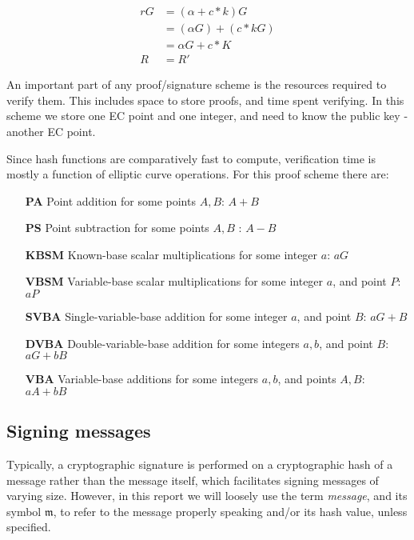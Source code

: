 \begin{align*}
r G &= (\alpha + c*k) G \\
	&= (\alpha G) + (c*k G) \\
	&= \alpha G + c*K \\
  R &= R'
\end{align*}

An important part of any proof/signature scheme is the resources required to verify them. This includes space to store proofs, and time spent verifying. In this scheme we store one EC point and one integer, and need to know the public key - another EC point.

Since hash functions are comparatively fast to compute, verification time is mostly a function of elliptic curve operations. For this proof scheme there are: 

\begin{itemize}
    \setlength\itemsep{\listspace}
    \item [\textbf{PA}] Point addition for some points $A, B$: $A + B$ \quad [1]
    \item [\textbf{PS}] Point subtraction for some points $A, B$ : $A - B$ \quad [0]
    \item [\textbf{KBSM}] Known-base scalar multiplications for some integer $a$: $a G$ \quad [1]
    \item [\textbf{VBSM}] Variable-base scalar multiplications for some integer $a$, and point $P$: $a P$ \quad [1]
    \item [\textbf{SVBA}] Single-variable-base addition for some integer $a$, and point $B$: $a G + B$ \quad [0]
    \item [\textbf{DVBA}] Double-variable-base addition for some integers $a, b$, and point $B$: $a G + b B$ \quad [0]
    \item [\textbf{VBA}] Variable-base additions for some integers $a, b$, and points $A, B$: $a A + b B$ \quad [0]
\end{itemize}


\subsection{Signing messages}
\label{sec:signing-messages}

Typically, a cryptographic signature is performed on a cryptographic hash of a message rather than the message itself, which facilitates signing messages of varying size. However, in this report we will loosely use the term {\em message}, and its symbol $\mathfrak{m}$, to refer to the message properly speaking and/or its hash value, unless specified.

